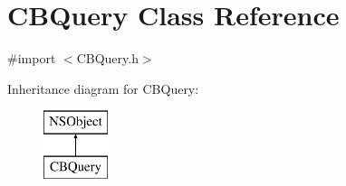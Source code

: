 \hypertarget{interface_c_b_query}{\section{C\+B\+Query Class Reference}
\label{interface_c_b_query}
}


{\ttfamily \#import $<$C\+B\+Query.\+h$>$}

Inheritance diagram for C\+B\+Query\+:\begin{figure}[H]
\begin{center}
\leavevmode
\includegraphics[height=2.000000cm]{interface_c_b_query}
\end{center}
\end{figure}
